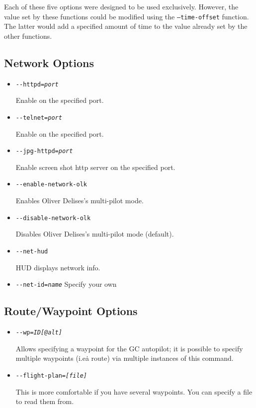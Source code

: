 Each of these five options were designed to be used exclusively.  However, the
value set by these functions could be modified using the \texttt{--time-offset}
function. The latter would add a specified amount of time to the value
already set by the other functions.
\subsection{Network Options}
\begin{itemize}
\item{\texttt{-$ $-httpd={\it port}}}

  Enable  on the specified port.

\item{\texttt{-$ $-telnet={\it port}}}

  Enable  on the specified port.

\item{\texttt{-$ $-jpg-httpd={\it port}}}

  Enable screen shot http server on the specified port.

\item{\texttt{-$ $-enable-network-olk}}

  Enables Oliver Delises's multi-pilot mode.

\item{\texttt{-$ $-disable-network-olk}}

  Disables Oliver Delises's multi-pilot mode (default).

\item{\texttt{-$ $-net-hud}}

  HUD displays network info.

\item{\texttt{-$ $-net-id={\it name}}}
  Specify your own 
 \end{itemize}
\subsection{Route/Waypoint Options}
\begin{itemize}
\item{\texttt{-$ $-wp={\it ID[@alt]}}}

  Allows specifying a waypoint for the GC autopilot; it is possible to
  specify multiple waypoints (i.e\. a route) via multiple instances of
  this command.

\item{\texttt{-$ $-flight-plan={\it [file]}}}

  This is more comfortable if you have several waypoints. You can
  specify a file to read them from.
\end{itemize}

